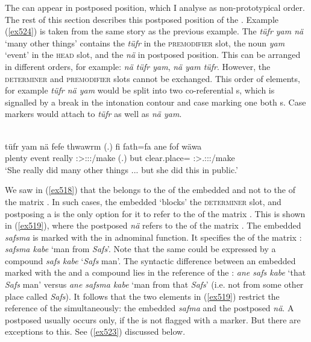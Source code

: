 The  can appear in postposed position, which I analyse as non-prototypical order. The rest of this section describes this postposed position of the . Example (\ref{ex524}) is taken from the same story as the previous example. The  \emph{tüfr yam nä} `many other things' contains the  \emph{tüfr} in the \textsc{premodifier} slot, the noun \emph{yam} `event' in the \textsc{head} slot, and the  \emph{nä} in postposed position. This  can be arranged in different orders, for example: \emph{nä tüfr yam}, \emph{nä yam tüfr}. However, the \textsc{determiner} and \textsc{premodifier} slots cannot be exchanged. This order of elements, for example \emph{tüfr nä yam} would be split into two co-referential s, which is signalled by a break in the intonation contour and case marking one both s. Case markers would attach to \emph{tüfr} as well as \emph{nä yam}.

\begin{exe}
	\\
	\gll tüfr yam nä fefe thwawrm (.) fi fath=fa ane fof wäwa\\
	plenty event \Indf{} really \Sg:\Sbj>\Stpl:\Obj:\Pst:\Dur/make (.) but {clear.place=\Abl} \Dem{} \Emph{} \Sg:\Sbj>\Tsg.\F:\Obj:\Pst:\Ipfv/make\\
	\trans `She really did many other things ... but she did this in public.'\\
	\label{ex524}
\end{exe}

We saw in (\ref{ex518}) that the  belongs to the  of the embedded  and not to the  of the matrix . In such cases, the embedded  `blocks' the \textsc{determiner} slot, and postposing a  is the only option for it to refer to the  of the matrix . This is shown in (\ref{ex519}), where the postposed  \emph{nä} refers to the  of the matrix . The embedded  \emph{safsma} is marked with the   in adnominal function. It specifies the  of the matrix : \emph{safsma kabe} `man from \emph{Safs}'. Note that the same could be expressed by a  compound \emph{safs kabe} `\emph{Safs} man'. The syntactic difference between an embedded  marked with the   and a  compound lies in the reference of the : \emph{ane safs kabe} `that \emph{Safs} man' versus \emph{ane safsma kabe} `man from that \emph{Safs}' (i.e. not from some other place called \emph{Safs}). It follows that the two elements in (\ref{ex519}) restrict the reference of the  simultaneously: the embedded  \emph{safma} and the postposed  \emph{nä}. A postposed  usually occurs only, if the  is not flagged with a  marker. But there are exceptions to this. See (\ref{ex523}) discussed below.

